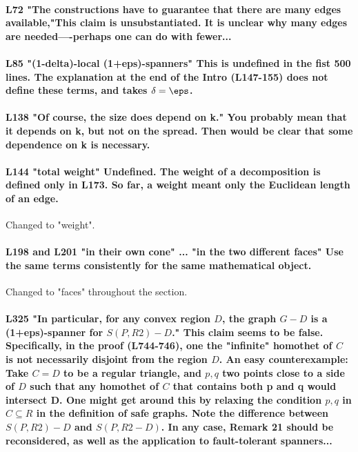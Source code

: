 \paragraph{L72 "The constructions have to guarantee that there are many edges available,"This claim is unsubstantiated. It is unclear why many edges are needed----perhaps one can do with fewer...}

\paragraph{L85 "(1-delta)-local (1+eps)-spanners" This is undefined in the fist 500 lines. The explanation at the end of the Intro (L147-155) does not define these terms, and takes $\delta=\eps$.}

\paragraph{L138 "Of course, the size does depend on k." You probably mean that it depends on k, but not on the spread. Then would be clear that some dependence on k is necessary.}

\paragraph{L144 "total weight" Undefined. The weight of a decomposition is defined only in L173. So far, a weight meant only the Euclidean length of an edge.} Changed to "weight".

\paragraph{L198 and L201 "in their own cone" ... "in the two different faces" Use the same terms consistently for the same mathematical object.} Changed to "faces" throughout the section.

\paragraph{L325 "In particular, for any convex region $D$, the graph $G-D$ is a (1+eps)-spanner for $S(P,R2)-D$." This claim seems to be false. Specifically, in the proof (L744-746), one the "infinite" homothet of $C$ is not necessarily disjoint from the region $D$. An easy counterexample: Take $C=D$ to be a regular triangle, and $p,q$ two points close to a side of $D$ such that any homothet of $C$ that contains both p and q would intersect D. One might get around this by relaxing the condition $p,q$ in $C \subseteq R$ in the definition of safe graphs. Note the difference between $S(P,R2)-D$ and $S(P,R2-D)$. In any case, Remark 21 should be reconsidered, as well as the application to fault-tolerant spanners...}

